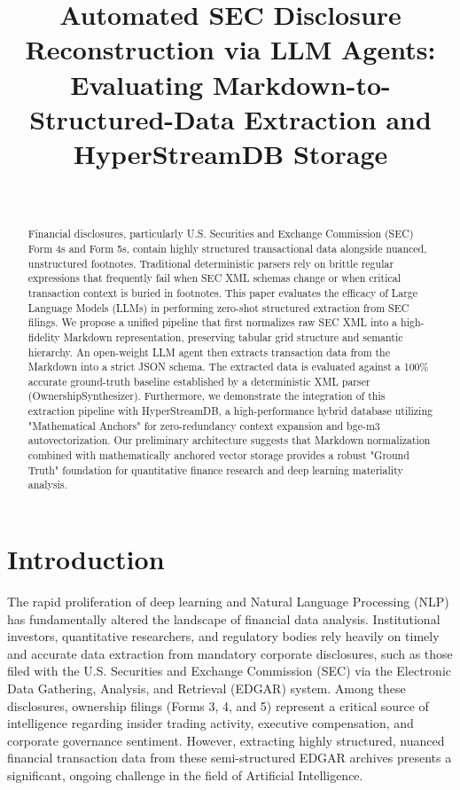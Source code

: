 \documentclass[journal, onecolumn]{IEEEtran}
\begin{document}
\title{Automated SEC Disclosure Reconstruction via LLM Agents: Evaluating Markdown-to-Structured-Data Extraction and HyperStreamDB Storage}

\author{
    \\
}

\maketitle

\begin{abstract}
Financial disclosures, particularly U.S. Securities and Exchange Commission (SEC) Form 4s and Form 5s, contain highly structured transactional data alongside nuanced, unstructured footnotes. Traditional deterministic parsers rely on brittle regular expressions that frequently fail when SEC XML schemas change or when critical transaction context is buried in footnotes. This paper evaluates the efficacy of Large Language Models (LLMs) in performing zero-shot structured extraction from SEC filings. We propose a unified pipeline that first normalizes raw SEC XML into a high-fidelity Markdown representation, preserving tabular grid structure and semantic hierarchy. An open-weight LLM agent then extracts transaction data from the Markdown into a strict JSON schema. The extracted data is evaluated against a 100\% accurate ground-truth baseline established by a deterministic XML parser (OwnershipSynthesizer). Furthermore, we demonstrate the integration of this extraction pipeline with HyperStreamDB, a high-performance hybrid database utilizing "Mathematical Anchors" for zero-redundancy context expansion and bge-m3 autovectorization. Our preliminary architecture suggests that Markdown normalization combined with mathematically anchored vector storage provides a robust "Ground Truth" foundation for quantitative finance research and deep learning materiality analysis.
\end{abstract}

\section{Introduction}
The rapid proliferation of deep learning and Natural Language Processing (NLP) has fundamentally altered the landscape of financial data analysis. Institutional investors, quantitative researchers, and regulatory bodies rely heavily on timely and accurate data extraction from mandatory corporate disclosures, such as those filed with the U.S. Securities and Exchange Commission (SEC) via the Electronic Data Gathering, Analysis, and Retrieval (EDGAR) system. Among these disclosures, ownership filings (Forms 3, 4, and 5) represent a critical source of intelligence regarding insider trading activity, executive compensation, and corporate governance sentiment. However, extracting highly structured, nuanced financial transaction data from these semi-structured EDGAR archives presents a significant, ongoing challenge in the field of Artificial Intelligence.
\end{document}
